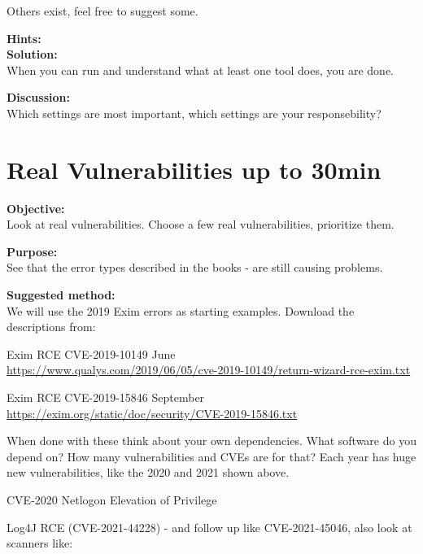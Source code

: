 \documentclass[a4paper,11pt,notitlepage]{report}
\begin{document}
Others exist, feel free to suggest some.

{\bf Hints:}\\

{\bf Solution:}\\
When you can run and understand what at least one tool does, you are done.

{\bf Discussion:}\\
Which settings are most important, which settings are your responsebility?



\chapter{Real Vulnerabilities up to 30min}
\label{ex:real-vulns-exim}

{\bf Objective:}\\
Look at real vulnerabilities. Choose a few real vulnerabilities, prioritize them.

{\bf Purpose:}\\
See that the error types described in the books - are still causing problems.

{\bf Suggested method:}\\
We will use the 2019 Exim errors as starting examples. Download the descriptions from:
\begin{list2}
\item Exim RCE CVE-2019-10149 June\\ \url{https://www.qualys.com/2019/06/05/cve-2019-10149/return-wizard-rce-exim.txt}

\item Exim RCE CVE-2019-15846 September\\
\url{https://exim.org/static/doc/security/CVE-2019-15846.txt}
\end{list2}

When done with these think about your own dependencies. What software do you depend on? How many vulnerabilities and CVEs are for that? Each year has huge new vulnerabilities, like the 2020 and 2021 shown above.

\begin{list2}
\item CVE-2020 Netlogon Elevation of Privilege \\
\item Log4J RCE (CVE-2021-44228) - and follow up like CVE-2021-45046, also look at scanners like:\\
\end{list2}
\end{document}
